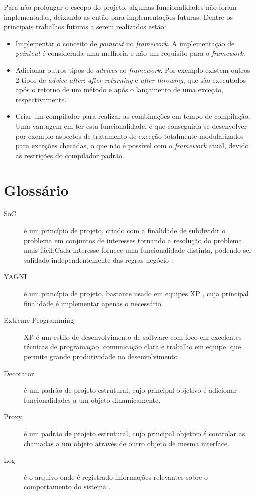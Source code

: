 \documentclass[tc,oneside]{iiufrgs}
\begin{document}
Para não prolongar o escopo do projeto, algumas funcionalidades não foram implementadas, deixando-as então para implementações futuras. Dentre os principais trabalhos futuros a serem realizados estão:

\begin{itemize}
\item Implementar o conceito de \textit{pointcut} no \textit{framework}. A implementação de \textit{pointcut} é considerada uma melhoria e não um requisito para o \textit{framework}.

\item Adicionar outros tipos de \textit{advices} ao \textit{framework}. Por exemplo existem outros 2 tipos de \textit{advice after}: \textit{after returning} e \textit{after throwing}, que são executados após o retorno de um 
 método e após o lançamento de uma exceção, respectivamente.
 
 \item Criar um compilador para realizar as combinações em tempo de compilação. Uma vantagem em ter esta funcionalidade, é que conseguiria-se desenvolver por exemplo aspectos de tratamento de exceção totalmente modularizados para exceções checadas, o que não é possível com o \textit{framework} atual, devido as restrições do compilador padrão.
\end{itemize}

\singlespacing



\chapter*{Glossário}

\begin{description}
	\item[SoC] é um princípio de projeto, criado com a finalidade de subdividir o problema em conjuntos de interesses tornando a resolução do problema mais fácil.Cada interesse fornece uma funcionalidade distinta, podendo ser validado independentemente das regras negócio \cite{pressman2010engineering}.
	\item [YAGNI] é um princípio de projeto, bastante usado em equipes XP , cuja principal finalidade é implementar apenas o necessário.
	\item[Extreme Programming] XP é um estilo de desenvolvimento de software com foco em excelentes técnicas de programação, comunicação clara e trabalho em equipe, que permite grande produtividade no desenvolvimento \cite{beck2004extreme}.
\item [Decorator] é um padrão de projeto estrutural, cujo principal objetivo é adicionar funcionalidades a um objeto dinamicamente.
\item [Proxy] é um padrão de projeto estrutural, cujo principal objetivo é controlar as chamadas a um objeto através de outro objeto de mesma interface.
\item [Log] é o arquivo onde é registrado informações relevantes sobre o comportamento do sistema \cite{log}.
\end{description}
\end{document}
